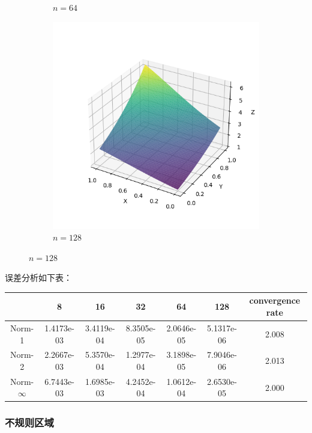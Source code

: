 \documentclass[lang=cn,a4paper,newtx,bibend=bibtex]{elegantpaper}
\begin{document}
\begin{figure}[H]
\begin{subfigure}[b]{0.18\textwidth}
      \caption{$n = 64$}
  \end{subfigure}
  \hfill
  \begin{subfigure}[b]{0.18\textwidth}
      \includegraphics[width=\textwidth]{../../res_bac/res-[data|1-mixed-regular-e128].png}
      \caption{$n = 128$}
  \end{subfigure}
\end{figure}

误差分析如下表：

\begin{table}[H]
  \centering
  \begin{tabular}{|c|c|c|c|c|c|c|}
  \hline
   & 8 & 16 & 32 & 64 & 128 & convergence rate \\
  \hline
  Norm-1 & 1.4173e-03 & 3.4119e-04 & 8.3505e-05 & 2.0646e-05 & 5.1317e-06 & 2.008 \\
  Norm-2 & 2.2667e-03 & 5.3570e-04 & 1.2977e-04 & 3.1898e-05 & 7.9046e-06 & 2.013 \\
  Norm-$\infty$ & 6.7443e-03 & 1.6985e-03 & 4.2452e-04 & 1.0612e-04 & 2.6530e-05 & 2.000  \\
  \hline
  \end{tabular}
  \end{table}

\subsubsection{不规则区域}
\end{document}
